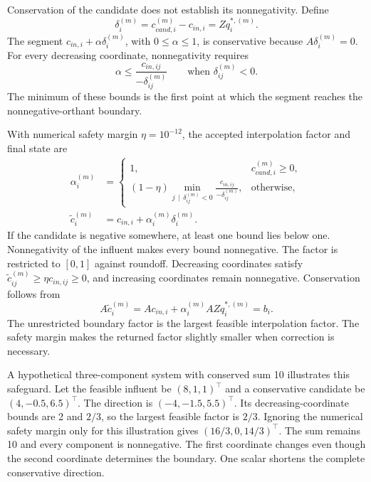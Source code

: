 Conservation of the candidate does not establish its nonnegativity. Define
\begin{equation}
\delta_i^{(m)}=c_{cand,i}^{(m)}-c_{in,i}=Zq_i^{*,(m)}.
\label{eq:projection_candidate_direction}
\end{equation}
The segment $c_{in,i}+\alpha\delta_i^{(m)}$, with $0\leq\alpha\leq1$, is conservative because $A\delta_i^{(m)}=0$. For every decreasing coordinate, nonnegativity requires
\begin{equation}
\alpha\leq\frac{c_{in,ij}}{-\delta_{ij}^{(m)}}
\qquad\text{when }\delta_{ij}^{(m)}<0.
\label{eq:projection_coordinate_bound}
\end{equation}
The minimum of these bounds is the first point at which the segment reaches the nonnegative-orthant boundary.

With numerical safety margin $\eta=10^{-12}$, the accepted interpolation factor and final state are
\begin{equation}
\begin{split}
\alpha_i^{(m)}&=
\begin{cases}
1, & c_{cand,i}^{(m)}\geq0,\\
(1-\eta)\displaystyle\min_{j\,\mid\,\delta_{ij}^{(m)}<0}
\frac{c_{in,ij}}{-\delta_{ij}^{(m)}}, & \text{otherwise},
\end{cases}\\
\tilde c_i^{(m)}&=c_{in,i}+\alpha_i^{(m)}\delta_i^{(m)}.
\end{split}
\label{eq:projection_positivity_backtracking}
\end{equation}
If the candidate is negative somewhere, at least one bound lies below one. Nonnegativity of the influent makes every bound nonnegative. The factor is restricted to $[0,1]$ against roundoff. Decreasing coordinates satisfy $\tilde c_{ij}^{(m)}\geq\eta c_{in,ij}\geq0$, and increasing coordinates remain nonnegative. Conservation follows from
\begin{equation}
A\tilde c_i^{(m)}=Ac_{in,i}+\alpha_i^{(m)}AZq_i^{*,(m)}=b_i.
\label{eq:projection_final_conservation}
\end{equation}
The unrestricted boundary factor is the largest feasible interpolation factor. The safety margin makes the returned factor slightly smaller when correction is necessary.

A hypothetical three-component system with conserved sum 10 illustrates this safeguard. Let the feasible influent be $(8,1,1)^\top$ and a conservative candidate be $(4,-0.5,6.5)^\top$. The direction is $(-4,-1.5,5.5)^\top$. Its decreasing-coordinate bounds are 2 and $2/3$, so the largest feasible factor is $2/3$. Ignoring the numerical safety margin only for this illustration gives $(16/3,0,14/3)^\top$. The sum remains 10 and every component is nonnegative. The first coordinate changes even though the second coordinate determines the boundary. One scalar shortens the complete conservative direction.

